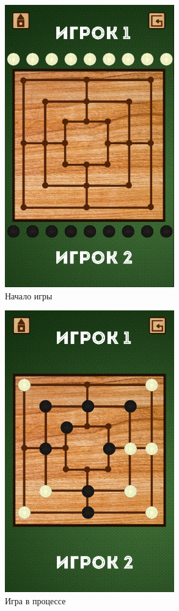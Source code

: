 \documentclass[a4paper]{article}
\begin{document}
\begin{figure}[H]
	\begin{center}
		\includegraphics[scale = 0.8]{screens/GameActivity_1.png}
		\caption{Начало игры} 
		\label{pic:pic_name} %
	\end{center}
\end{figure}

\begin{figure}[H]
	\begin{center}
		\includegraphics[scale = 0.8]{screens/GameActivity_2.png}
		\caption{Игра в процессе} 
		\label{pic:pic_name} %
	\end{center}
\end{figure}
\end{document}
